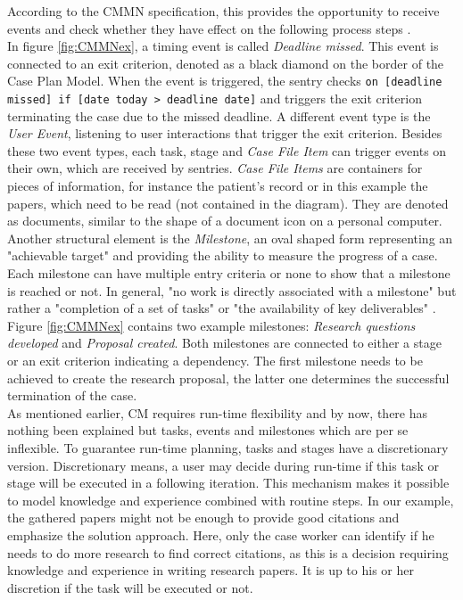 According to the CMMN specification, this provides the opportunity to receive events and check whether they have effect on the following process steps \cite{CMMNspec2014}. \\
In figure \ref{fig:CMMNex}, a timing event is called \textit{Deadline missed}. This event is connected to an exit criterion, denoted as a black diamond on the border of the Case Plan Model. \newpage When the event is triggered, the sentry checks \texttt{on [deadline missed] if [date today > deadline date]} and triggers the exit criterion terminating the case due to the missed deadline. A different event type is the \textit{User Event}, listening to user interactions that trigger the exit criterion. Besides these two event types, each task, stage and \textit{Case File Item} can trigger events on their own, which are received by sentries. \textit{Case File Items} are containers for pieces of information, for instance the patient's record or in this example the papers, which need to be read (not contained in the diagram). They are denoted as documents, similar to the shape of a document icon on a personal computer.\\
Another structural element is the \textit{Milestone}, an oval shaped form representing an "achievable target" \cite{CMMNspec2014} and providing the ability to measure the progress of a case. Each milestone can have multiple entry criteria or none to show that a milestone is reached or not. In general, "no work is directly associated with a milestone" \cite{CMMNspec2014} but rather a "completion of a set of tasks" or "the availability of key deliverables" \cite{CMMNspec2014}. \\
Figure \ref{fig:CMMNex} contains two example milestones: \textit{Research questions developed} and \textit{Proposal created}. Both milestones are connected to either a stage or an exit criterion indicating a dependency. The first milestone needs to be achieved to create the research proposal, the latter one determines the successful termination of the case. \\
As mentioned earlier, CM requires run-time flexibility and by now, there has nothing been explained but tasks, events and milestones which are per se inflexible. To guarantee run-time planning, tasks and stages have a discretionary version. Discretionary means, a user may decide during run-time if this task or stage will be executed in a following iteration. This mechanism makes it possible to model knowledge and experience combined with routine steps. In our example, the gathered papers might not be enough to provide good citations and emphasize the solution approach. Here, only the case worker can identify if he needs to do more research to find correct citations, as this is a decision requiring knowledge and experience in writing research papers. It is up to his or her discretion if the task will be executed or not. \\
